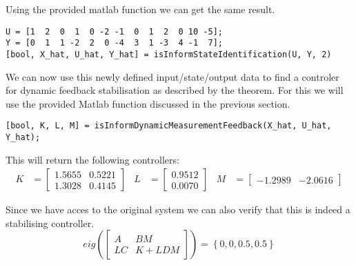 Using the provided matlab function  we can get the same result.
\begin{lstlisting}
U = [1  2  0  1  0 -2 -1  0  1  2  0 10 -5];
Y = [0  1  1 -2  2  0 -4  3  1 -3  4 -1  7];
[bool, X_hat, U_hat, Y_hat] = isInformStateIdentification(U, Y, 2)
\end{lstlisting}


We can now use this newly defined input/state/output data to find a controler for dynamic feedback stabilisation as described by the theorem. For this we will use the provided Matlab function discussed in the previous section.
\begin{lstlisting}
[bool, K, L, M] = isInformDynamicMeasurementFeedback(X_hat, U_hat, Y_hat);
\end{lstlisting}
This will return the following controllers:
\begin{align*}
K &= \begin{bmatrix} 1.5655&0.5221\\1.3028&0.4145 \end{bmatrix} &
L &= \begin{bmatrix} 0.9512\\0.0070 \end{bmatrix} &
M &= \begin{bmatrix} -1.2989&-2.0616 \end{bmatrix} 
\end{align*}

Since we have acces to the original system we can also verify that this is indeed a stabilising controller.
\[ eig\left( \begin{bmatrix} A & BM \\ LC & K + LDM \end{bmatrix} \right)  = \left\{ 0,0,0.5,0.5 \right\}\]
